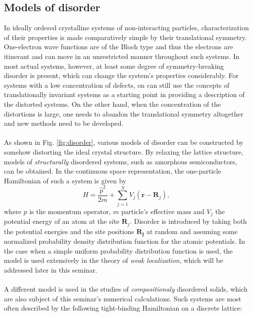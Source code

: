 \documentclass[10pt,a4paper]{article}
\begin{document}
\subsection{Models of disorder }
In ideally ordered crystalline systems of non-interacting particles, characterization of their properties is made comparatively simple by their translational symmetry. One-electron wave functions are of the Bloch type and thus the electrons are itinerant and can move in an unrestricted manner throughout such systems. In most actual systems, however, at least some degree of symmetry-breaking disorder is present, which can change the system's properties considerably. For systems with a low concentration of defects, on can still use the concepts of translationally invariant systems as a starting point in providing a description of the distorted systems. On the other hand, when the concentration of the distortions is large, one needs to abandon the translational symmetry altogether and new methods need to be developed. \\\\
\noindent As shown in Fig. \ref{fig:disorder}, various models of disorder can be constructed by somehow distorting the ideal crystal structure. By relaxing the lattice structure, models of \emph{structurally} disordered systems, such as amorphous semiconductors, can be obtained. In the continuous space representation, the one-particle Hamiltonian of such a system is given by
\begin{equation}\label{eq:amorphous_hamiltonian}
H=\frac{\hat{p}^2}{2m} + \sum\limits_{j=1}^N V_j(\mathbf{r}-\mathbf{R}_j),  
\end{equation}
where $\hat{p}$ is the momentum operator, $m$ particle's effective mass and $V_j$ the potential energy of an atom at the site $\mathbf{R}_j$. Disorder is introduced by taking both the potential energies and the site positions $\mathbf{R_j}$ at random and assuming some normalized probability density distribution function for the atomic potentials. In the case when a simple uniform probability distribution function is used, the model is used extensively in the theory of \emph{weak localization}, which will be addressed later in this seminar. \\\\
\noindent A different model is used in the studies of \emph{compositionaly} disordered solids, which are also subject of this seminar's numerical calculations. Such systems are most often described by the following tight-binding Hamiltonian on a discrete lattice:
\end{document}
